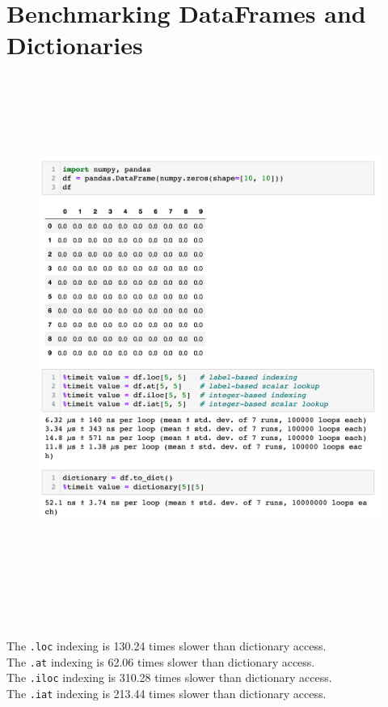 \section{Benchmarking DataFrames and Dictionaries}

\label{benchmarkDF}
\begin{figure}[h!]
	\centering
	\includegraphics[height=17cm]{Bilder/appendix/dfvsdict.png}
	\label{fig:dbscan-plot}
\end{figure}
\begin{lstlisting}[caption={Benchmark of Indexing with Python Data Structures}]
	   
\end{lstlisting}
The \lstinline|.loc| indexing is  130.24 times slower than dictionary access.\\
The \lstinline|.at|  indexing is  62.06 times slower than dictionary access.\\
The \lstinline|.iloc|  indexing is  310.28 times slower than dictionary access.\\
The \lstinline|.iat|  indexing is  213.44 times slower than dictionary access.

